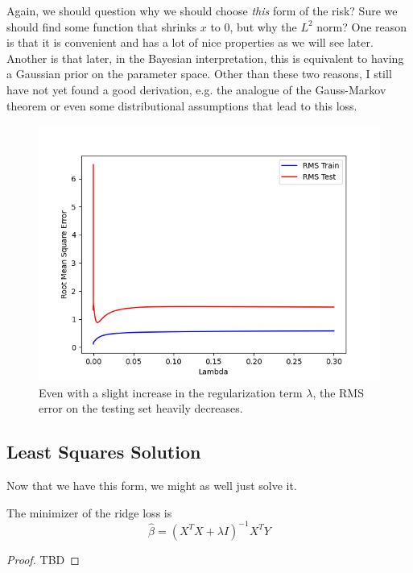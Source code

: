   Again, we should question why we should choose \textit{this} form of the risk? Sure we should find some function that shrinks $x$ to $0$, but why the $L^2$ norm? One reason is that it is convenient and has a lot of nice properties as we will see later. Another is that later, in the Bayesian interpretation, this is equivalent to having a Gaussian prior on the parameter space. Other than these two reasons, I still have not yet found a good derivation, e.g. the analogue of the Gauss-Markov theorem or even some distributional assumptions that lead to this loss. 

  \begin{figure}[H]
    \centering
    \includegraphics[scale=0.5]{img/Lambda_vs_RMS.png}
    \caption{Even with a slight increase in the regularization term $\lambda$, the RMS error on the testing set heavily decreases. }
    \label{fig:enter-label}
  \end{figure} 

\subsection{Least Squares Solution}

  Now that we have this form, we might as well just solve it. 

  \begin{theorem}
    The minimizer of the ridge loss is 
    \begin{equation}
      \hat{\beta} = (X^T X+ \lambda I)^{-1} X^T Y
    \end{equation}
  \end{theorem}
  \begin{proof}
    TBD
  \end{proof} 

